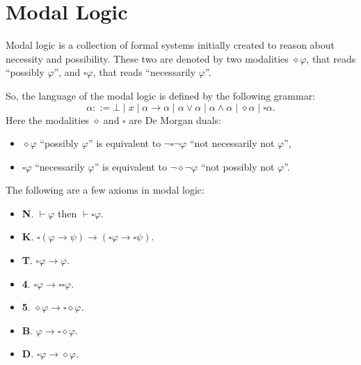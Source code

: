 \section{Modal Logic}

Modal logic is a collection of formal systems initially created to reason about necessity and possibility. These two are denoted by two modalities $\diamond\varphi$, that reads ``possibly $\varphi$'', and $\square\varphi$, that reads ``necessarily $\varphi$''.

So, the language of the modal logic is defined by the following grammar:
\[
\alpha ::= \bot \mid x \mid \alpha \rightarrow \alpha \mid \alpha \vee \alpha \mid \alpha \wedge \alpha \mid \diamond\alpha \mid \square\alpha.
\]
Here the modalities $\diamond$ and $\square$ are De Morgan duals:
\begin{itemize}
    \item $\diamond\varphi$ ``possibly $\varphi$'' is equivalent to $\neg\square\neg\varphi$ ``not necessarily not $\varphi$'',
    \item $\square\varphi$ ``necessarily $\varphi$'' is equivalent to $\neg\diamond\neg\varphi$ ``not possibly not $\varphi$''.
\end{itemize}

The following are a few axioms in modal logic:
\begin{itemize}
    \item \textbf{N}. $\vdash \varphi$ then $\vdash \square\varphi$.
    \item \textbf{K}. $\square(\varphi \rightarrow \psi) \rightarrow (\square\varphi \rightarrow \square\psi)$.
    \item \textbf{T}. $\square\varphi \rightarrow \varphi$.
    \item \textbf{4}. $\square\varphi \rightarrow \square\square\varphi$.
    \item \textbf{5}. $\diamond\varphi \rightarrow \square\diamond\varphi$.
    \item \textbf{B}. $\varphi \rightarrow \square\diamond\varphi$.
    \item \textbf{D}. $\square\varphi \rightarrow \diamond\varphi$.
\end{itemize}

